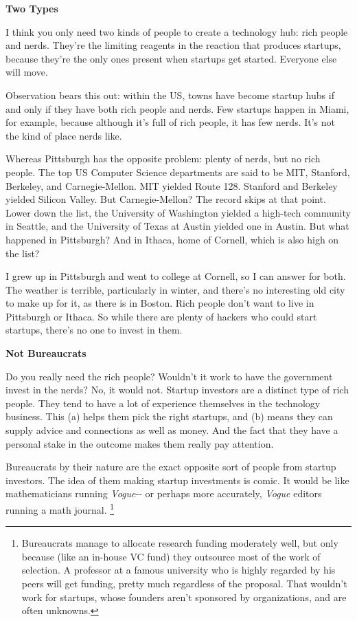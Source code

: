 \documentclass[12pt]{book}
\begin{document}
\textbf{Two Types}

I think you only need two kinds of people to create a technology hub:
rich people and nerds. They're the limiting reagents in the reaction
that produces startups, because they're the only ones present when
startups get started. Everyone else will move.

Observation bears this out: within the US, towns have become startup
hubs if and only if they have both rich people and nerds. Few startups
happen in Miami, for example, because although it's full of rich people,
it has few nerds. It's not the kind of place nerds like.

Whereas Pittsburgh has the opposite problem: plenty of nerds, but no
rich people. The top US Computer Science departments are said to be MIT,
Stanford, Berkeley, and Carnegie-Mellon. MIT yielded Route 128. Stanford
and Berkeley yielded Silicon Valley. But Carnegie-Mellon? The record
skips at that point. Lower down the list, the University of Washington
yielded a high-tech community in Seattle, and the University of Texas at
Austin yielded one in Austin. But what happened in Pittsburgh? And in
Ithaca, home of Cornell, which is also high on the list?

I grew up in Pittsburgh and went to college at Cornell, so I can answer
for both. The weather is terrible, particularly in winter, and there's
no interesting old city to make up for it, as there is in Boston. Rich
people don't want to live in Pittsburgh or Ithaca. So while there are
plenty of hackers who could start startups, there's no one to invest in
them.

\textbf{Not Bureaucrats}

Do you really need the rich people? Wouldn't it work to have the
government invest in the nerds? No, it would not. Startup investors are
a distinct type of rich people. They tend to have a lot of experience
themselves in the technology business. This (a) helps them pick the
right startups, and (b) means they can supply advice and connections as
well as money. And the fact that they have a personal stake in the
outcome makes them really pay attention.

Bureaucrats by their nature are the exact opposite sort of people from
startup investors. The idea of them making startup investments is comic.
It would be like mathematicians running \emph{Vogue}-\/- or perhaps more
accurately, \emph{Vogue} editors running a math journal.
\footnote{Bureaucrats manage to allocate research funding moderately well,
but only because (like an in-house VC fund) they outsource most of the
work of selection. A professor at a famous university who is highly
regarded by his peers will get funding, pretty much regardless of the
proposal. That wouldn't work for startups, whose founders aren't
sponsored by organizations, and are often unknowns.}
\end{document}

